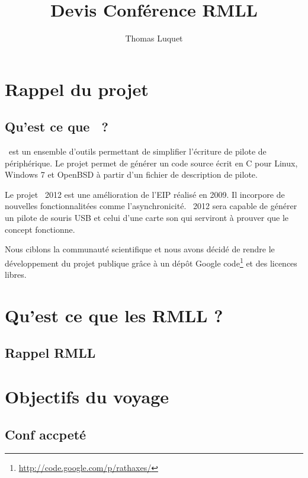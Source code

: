 \documentclass{rtxreport}
\author{Thomas Luquet}
\title{Devis Conférence RMLL}
\begin{document}
\maketitle

\rtxmaketitleblock

\tableofcontents

\chapter{Rappel du projet}

\section{Qu'est ce que \rtx\ ?}

\rtx\ est un ensemble d'outils permettant de simplifier l'écriture de pilote de
périphérique. Le projet permet de générer un code source écrit en C pour Linux,
Windows 7 et OpenBSD à partir d'un fichier de description de pilote.

Le projet \rtx\ 2012 est une amélioration de l'EIP réalisé en 2009. Il
incorpore de nouvelles fonctionnalitées comme l’asynchronicité. \rtx\ 2012 sera
capable de générer un pilote de souris USB et celui d'une carte son qui
serviront à prouver que le concept fonctionne.

Nous ciblons la communauté scientifique et nous avons décidé de rendre le
développement du projet publique grâce à un dépôt Google
code\footnote{\url{http://code.google.com/p/rathaxes/}} et des licences libres.



\chapter{Qu'est ce que les RMLL ?}

\section{Rappel RMLL}

\chapter{Objectifs du voyage}

\section{Conf accpeté}
\end{document}
